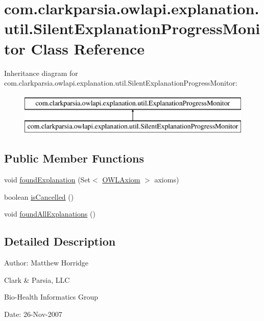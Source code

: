 \hypertarget{classcom_1_1clarkparsia_1_1owlapi_1_1explanation_1_1util_1_1_silent_explanation_progress_monitor}{\section{com.\-clarkparsia.\-owlapi.\-explanation.\-util.\-Silent\-Explanation\-Progress\-Monitor Class Reference}
\label{classcom_1_1clarkparsia_1_1owlapi_1_1explanation_1_1util_1_1_silent_explanation_progress_monitor}
}
Inheritance diagram for com.\-clarkparsia.\-owlapi.\-explanation.\-util.\-Silent\-Explanation\-Progress\-Monitor\-:\begin{figure}[H]
\begin{center}
\leavevmode
\includegraphics[height=2.000000cm]{classcom_1_1clarkparsia_1_1owlapi_1_1explanation_1_1util_1_1_silent_explanation_progress_monitor}
\end{center}
\end{figure}
\subsection*{Public Member Functions}
\begin{DoxyCompactItemize}
\item 
void \hyperlink{classcom_1_1clarkparsia_1_1owlapi_1_1explanation_1_1util_1_1_silent_explanation_progress_monitor_aeea5097f1e8955412befc5a834a2505d}{found\-Explanation} (Set$<$ \hyperlink{interfaceorg_1_1semanticweb_1_1owlapi_1_1model_1_1_o_w_l_axiom}{O\-W\-L\-Axiom} $>$ axioms)
\item 
boolean \hyperlink{classcom_1_1clarkparsia_1_1owlapi_1_1explanation_1_1util_1_1_silent_explanation_progress_monitor_a3dce2280fead5e2ca39d038d9faf06cb}{is\-Cancelled} ()
\item 
void \hyperlink{classcom_1_1clarkparsia_1_1owlapi_1_1explanation_1_1util_1_1_silent_explanation_progress_monitor_a57f882faed43ef845e863f6eb6cbde72}{found\-All\-Explanations} ()
\end{DoxyCompactItemize}


\subsection{Detailed Description}
Author\-: Matthew Horridge\par
 Clark \& Parsia, L\-L\-C\par
 Bio-\/\-Health Informatics Group\par
 Date\-: 26-\/\-Nov-\/2007\par
 \par
 

